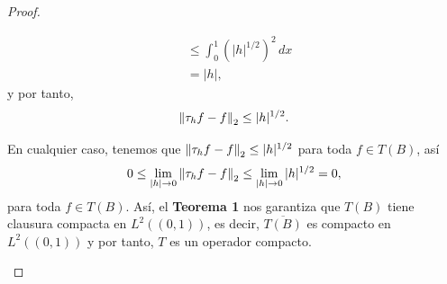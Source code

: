\begin{proof}
\begin{enumerate}
\begin{itemize}
\begin{align*}
                &\leq \int_0^1\left(|h|^{1/2}\right)^2\, dx\\
                &=|h|,
            \end{align*}
            y por tanto,
            \begin{align*}
                \left\|\tau_hf-f\right\|_2\leq |h|^{1/2}.
            \end{align*}
        \end{itemize}
        En cualquier caso, tenemos que $\left\|\tau_hf-f\right\|_2\leq |h|^{1/2}$ para toda $f \in T(B)$, así
        \begin{align*}
            0\leq \lim_{|h|\to 0}\left\|\tau_hf-f\right\|_2\leq \lim_{|h|\to 0}|h|^{1/2}=0,
        \end{align*}
        para toda $f \in T(B)$. Así, el \textbf{Teorema 1} nos garantiza que $T(B)$ tiene clausura compacta en $L^2((0,1))$, es decir, $\overline{T(B)}$ es compacto en $L^2((0,1))$ y por tanto, $T$ es un operador compacto.


\end{enumerate}
\end{proof}
